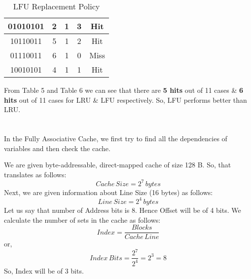\documentclass[12pt]{article}
\begin{document}
\begin{table}
\begin{tabular}{|c|c|c|c|c|}
\hline
01010101                                                                     & 2                  & 1                                                                         & 3                      & Hit                 \\ 
\hline
10110011                                                                     & 5                  & 1                                                                         & 2                      & Hit                 \\ 
\hline
01110011                                                                     & 6                  & 1                                                                         & 0                      & Miss                \\ 
\hline
10010101                                                                     & 4                  & 1                                                                         & 1                      & Hit                 \\
\hline
\end{tabular}
\caption{LFU Replacement Policy}
\end{table}

From Table 5 and Table 6 we can see that there are \textbf{5 hits} out of 11 cases \& \textbf{6 hits} out of 11 cases for LRU \& LFU respectively. So, LFU performs better than LRU.
\section{}

In the Fully Associative Cache, we first try to find all the dependencies of variables and then check the cache.

We are given byte-addressable, direct-mapped cache of size 128 B. So, that translates as follows:
\begin{equation*}
    Cache \, Size = 2^{7} \, bytes
\end{equation*}
Next, we are given information about Line Size (16 bytes) as follows:
\begin{equation*}
    Line \, Size = 2^4 \, bytes
\end{equation*}
Let us say that number of Address bits is 8. Hence Offset will be of 4 bits. We calculate the number of sets in the cache as follows:
\begin{equation*}
    Index = \frac{Blocks}{Cache \, Line}
\end{equation*}
or,
\begin{equation*}
    Index \, Bits = \frac{2^{7}}{2^4} = 2^3 = 8
\end{equation*}
So, Index will be of 3 bits.
	
\end{document}
